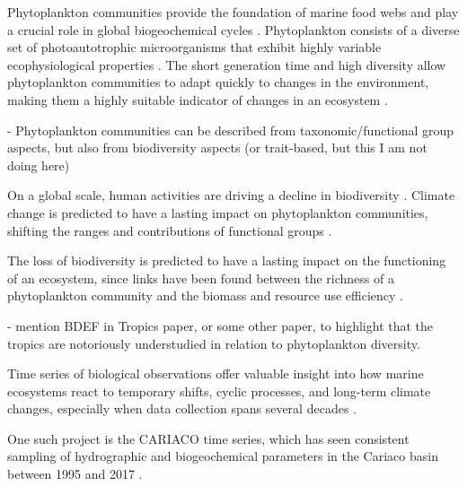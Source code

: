 \documentclass[draft]{agujournal2019}
\begin{document}
    Phytoplankton communities provide the foundation of marine food webs and play a crucial role in global biogeochemical cycles \cite{falkowski_biogeochemical_1998}.
    Phytoplankton consists of a diverse set of photoautotrophic microorganisms that exhibit highly variable ecophysiological properties \cite{appeltans_magnitude_2012}. The short generation time and high diversity allow phytoplankton communities to adapt quickly to changes in the environment, making them a highly suitable indicator of changes in an ecosystem \cite{alvarez-cobelas_what_1998, di_cavalho_temporal_2023}.

    - Phytoplankton communities can be described from taxonomic/functional group aspects, but also from biodiversity aspects (or trait-based, but this I am not doing here)   

    
    On a global scale, human activities are driving a decline in biodiversity \cite{tittensor_mid-term_2014}. Climate change is predicted to have a lasting impact on phytoplankton communities, shifting the ranges and contributions of functional groups \cite{henson_future_2021}. 

    
    The loss of biodiversity is predicted to have a lasting impact on the functioning of an ecosystem, since links have been found between the richness of a phytoplankton community and the biomass and resource use efficiency \cite{ptacnik_diversity_2008, lehtinen_phytoplankton_2017}. 
    
    - mention BDEF in Tropics paper, or some other paper, to highlight that the tropics are notoriously understudied in relation to phytoplankton diversity.


    Time series of biological observations offer valuable insight into how marine ecosystems react to temporary shifts, cyclic processes, and long-term climate changes, especially when data collection spans several decades \cite{carstensen_need_2014, henson_observing_2016}. 

    One such project is the CARIACO time series, which has seen consistent sampling of hydrographic and biogeochemical parameters in the Cariaco basin between 1995 and 2017 \cite{muller-karger_scientific_2019}. 
\end{document}
